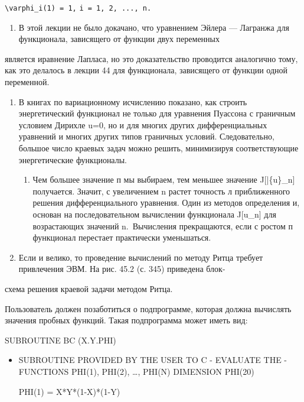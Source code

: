 \documentclass[
  ukrainian,
]{article}
\providecommand{\tightlist}{%
  \setlength{\itemsep}{0pt}\setlength{\parskip}{0pt}}
\begin{document}
\texttt{\textbackslash{}varphi\_i(1)\ =\ 1,}
\texttt{i\ =\ 1,\ 2,\ ...,\ n.}

\begin{enumerate}
\def\labelenumi{\arabic{enumi}.}
\setcounter{enumi}{1}
\tightlist
\item
  В этой лекции не было докачано, что уравнением Эйлера --- Лагранжа для
  функционала, зависящего от функции двух переменных
\end{enumerate}

является иравнение Лапласа, но это доказательство проводится аналогично
тому, как это делалось в лекции 44 для функционала, зависящего от
функции одной переменной.

\begin{enumerate}
\def\labelenumi{\arabic{enumi}.}
\setcounter{enumi}{2}
\item
  В книгах по вариационному исчислению показано, как строить
  энергетический функционал не только для уравнения Пуассона с граничным
  условием Дирихле u=0, но и для многих других дифференциальных
  уравнений и многих других типов граничных условий. Следовательно,
  большое число краевых задач можно решить, минимизируя соответствующие
  энергетические функционалы.

  \begin{enumerate}
  \def\labelenumii{\arabic{enumii}.}
  \setcounter{enumii}{3}
  \tightlist
  \item
    Чем большее значение п мы выбираем, тем меньшее значение
    J{[}\bar\{u\}\_n{]} получается. Значит, с увеличением n растет
    точность л приближенного решения дифференциального уравнения. Один
    из методов определения и, основан на последовательном вычислении
    функционала J{[}u\_n{]} для возрастающих значений n.~Вычисления
    прекращаются, если с ростом п функционал перестает практически
    уменьшаться.
  \end{enumerate}
\item
  Если и велико, то проведение вычислений по методу Ритца требует
  привлечения ЭВМ. На рис. 45.2 (с. 345) приведена блок-
\end{enumerate}

схема решения краевой задачи методом Ритца.

Пользователь должен позаботиться о подпрограмме, которая должна
вычислять значения пробных функций. Такая подпрограмма может иметь вид:

SUBROUTINE BC (X.Y.PHI)

\begin{itemize}
\item
  SUBROUTINE PROVIDED BY THE USER TO C - EVALUATE THE - FUNCTIONS
  PHI(1), PHI(2), \ldots, PHI(N) DIMENSION PHI(20)

  PHI(1) = X*Y*(1-X)*(1-Y)
\end{itemize}
\end{document}
